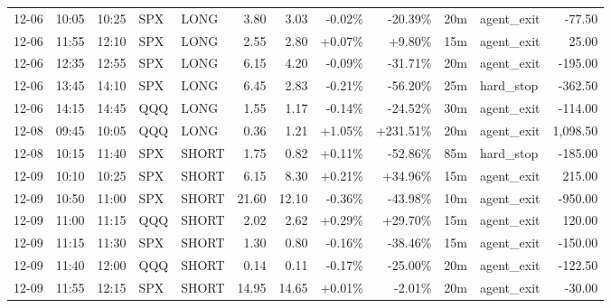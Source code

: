 \documentclass[11pt,a4paper]{article}
\begin{document}
\begin{center}
\begin{longtable}{>{\color{txtmain}}l l l l l r r r r r >{\color{txtmain}}l r}
12-06 & 10:05 & 10:25 & SPX & LONG & 3.80 & 3.03 & \textcolor{lossred}{-0.02\%} & \textcolor{lossred}{-20.39\%} & 20m & agent\_exit & \textcolor{lossred}{-77.50} \\
12-06 & 11:55 & 12:10 & SPX & LONG & 2.55 & 2.80 & \textcolor{wingreen}{+0.07\%} & \textcolor{wingreen}{+9.80\%} & 15m & agent\_exit & \textcolor{wingreen}{25.00} \\
12-06 & 12:35 & 12:55 & SPX & LONG & 6.15 & 4.20 & \textcolor{lossred}{-0.09\%} & \textcolor{lossred}{-31.71\%} & 20m & agent\_exit & \textcolor{lossred}{-195.00} \\
12-06 & 13:45 & 14:10 & SPX & LONG & 6.45 & 2.83 & \textcolor{lossred}{-0.21\%} & \textcolor{lossred}{-56.20\%} & 25m & hard\_stop & \textcolor{lossred}{-362.50} \\
12-06 & 14:15 & 14:45 & QQQ & LONG & 1.55 & 1.17 & \textcolor{lossred}{-0.14\%} & \textcolor{lossred}{-24.52\%} & 30m & agent\_exit & \textcolor{lossred}{-114.00} \\
12-08 & 09:45 & 10:05 & QQQ & LONG & 0.36 & 1.21 & \textcolor{wingreen}{+1.05\%} & \textcolor{wingreen}{+231.51\%} & 20m & agent\_exit & \textcolor{wingreen}{1,098.50} \\
12-08 & 10:15 & 11:40 & SPX & SHORT & 1.75 & 0.82 & \textcolor{wingreen}{+0.11\%} & \textcolor{lossred}{-52.86\%} & 85m & hard\_stop & \textcolor{lossred}{-185.00} \\
12-09 & 10:10 & 10:25 & SPX & SHORT & 6.15 & 8.30 & \textcolor{wingreen}{+0.21\%} & \textcolor{wingreen}{+34.96\%} & 15m & agent\_exit & \textcolor{wingreen}{215.00} \\
12-09 & 10:50 & 11:00 & SPX & SHORT & 21.60 & 12.10 & \textcolor{lossred}{-0.36\%} & \textcolor{lossred}{-43.98\%} & 10m & agent\_exit & \textcolor{lossred}{-950.00} \\
12-09 & 11:00 & 11:15 & QQQ & SHORT & 2.02 & 2.62 & \textcolor{wingreen}{+0.29\%} & \textcolor{wingreen}{+29.70\%} & 15m & agent\_exit & \textcolor{wingreen}{120.00} \\
12-09 & 11:15 & 11:30 & SPX & SHORT & 1.30 & 0.80 & \textcolor{lossred}{-0.16\%} & \textcolor{lossred}{-38.46\%} & 15m & agent\_exit & \textcolor{lossred}{-150.00} \\
12-09 & 11:40 & 12:00 & QQQ & SHORT & 0.14 & 0.11 & \textcolor{lossred}{-0.17\%} & \textcolor{lossred}{-25.00\%} & 20m & agent\_exit & \textcolor{lossred}{-122.50} \\
12-09 & 11:55 & 12:15 & SPX & SHORT & 14.95 & 14.65 & \textcolor{wingreen}{+0.01\%} & \textcolor{lossred}{-2.01\%} & 20m & agent\_exit & \textcolor{lossred}{-30.00} \\

\end{longtable}
\end{center}
\end{document}
